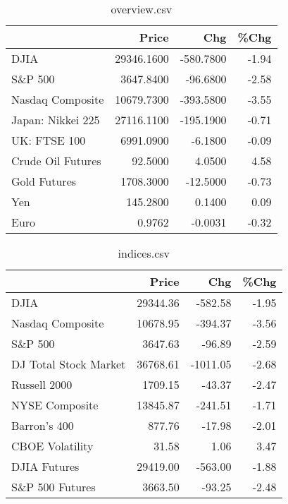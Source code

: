 \documentclass{article}%
\begin{document}
\begin{table}[htbp]%
\caption{overview.csv}%
\centering%
\begin{adjustbox}{width=1\textwidth}%
\begin{tabular}{lrrr}
\toprule
                  &      Price &       Chg &  \%Chg \\
\midrule
             DJIA & 29346.1600 & -580.7800 & -1.94 \\
          S\&P 500 &  3647.8400 &  -96.6800 & -2.58 \\
 Nasdaq Composite & 10679.7300 & -393.5800 & -3.55 \\
Japan: Nikkei 225 & 27116.1100 & -195.1900 & -0.71 \\
     UK: FTSE 100 &  6991.0900 &   -6.1800 & -0.09 \\
Crude Oil Futures &    92.5000 &    4.0500 &  4.58 \\
     Gold Futures &  1708.3000 &  -12.5000 & -0.73 \\
              Yen &   145.2800 &    0.1400 &  0.09 \\
             Euro &     0.9762 &   -0.0031 & -0.32 \\
\bottomrule
\end{tabular}
%
\end{adjustbox}%
\end{table}

%


\begin{table}[htbp]%
\caption{indices.csv}%
\centering%
\begin{adjustbox}{width=1\textwidth}%
\begin{tabular}{lrrr}
\toprule
                      &    Price &      Chg &  \%Chg \\
\midrule
                 DJIA & 29344.36 &  -582.58 & -1.95 \\
     Nasdaq Composite & 10678.95 &  -394.37 & -3.56 \\
              S\&P 500 &  3647.63 &   -96.89 & -2.59 \\
DJ Total Stock Market & 36768.61 & -1011.05 & -2.68 \\
         Russell 2000 &  1709.15 &   -43.37 & -2.47 \\
       NYSE Composite & 13845.87 &  -241.51 & -1.71 \\
         Barron's 400 &   877.76 &   -17.98 & -2.01 \\
      CBOE Volatility &    31.58 &     1.06 &  3.47 \\
         DJIA Futures & 29419.00 &  -563.00 & -1.88 \\
      S\&P 500 Futures &  3663.50 &   -93.25 & -2.48 \\
\bottomrule
\end{tabular}
%
\end{adjustbox}%
\end{table}
\end{document}
